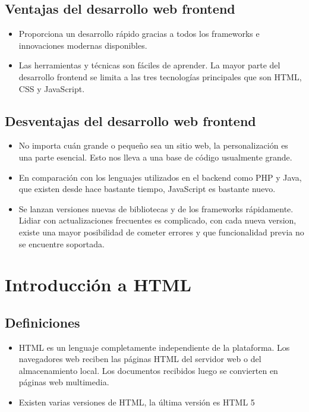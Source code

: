 \documentclass[a4paper,12pt]{article}
\begin{document}
\subsection*{Ventajas del desarrollo web frontend}
\begin{itemize}
    \item Proporciona un desarrollo rápido gracias a todos los
     frameworks e innovaciones modernas disponibles.
    \item Las herramientas y técnicas son fáciles de aprender. La mayor
    parte del desarrollo frontend se limita a las tres tecnologías principales que son HTML, CSS y JavaScript. 
\end{itemize}

\subsection*{Desventajas del desarrollo web frontend}
\begin{itemize}
    \item No importa cuán grande o pequeño sea un sitio web, la
     personalización es una parte esencial. Esto nos lleva a una base de código usualmente grande.
    \item En comparación con los lenguajes utilizados en el backend
     como PHP y Java, que existen desde hace bastante tiempo, JavaScript es bastante nuevo.
    \item Se lanzan versiones nuevas de bibliotecas y de los frameworks rápidamente.
     Lidiar con actualizaciones frecuentes es complicado, con cada nueva version,
      existe una mayor posibilidad de cometer errores y que funcionalidad previa no se encuentre soportada.
\end{itemize}

\section{Introducción a HTML}


\subsection*{Definiciones}
\begin{itemize}
    \item HTML es un lenguaje completamente independiente de la
    plataforma. Los navegadores web reciben las páginas HTML
    del servidor web o del almacenamiento local. Los documentos
    recibidos luego se convierten en páginas web multimedia.
    \item Existen varias versiones de HTML, la última versión es HTML 5    
\end{itemize}
\end{document}
